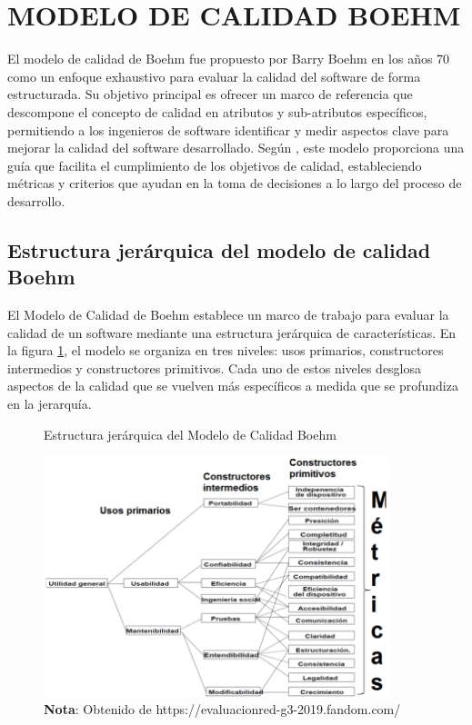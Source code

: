 	\section{MODELO DE CALIDAD BOEHM}
		El modelo de calidad de Boehm fue propuesto por Barry Boehm en los años 70 como un enfoque exhaustivo para evaluar la calidad del software de forma estructurada. Su objetivo principal es ofrecer un marco de referencia que descompone el concepto de calidad en atributos y sub-atributos específicos, permitiendo a los ingenieros de software identificar y medir aspectos clave para mejorar la calidad del software desarrollado. Según \textcite{pressman2010ingenieria}, este modelo proporciona una guía que facilita el cumplimiento de los objetivos de calidad, estableciendo métricas y criterios que ayudan en la toma de decisiones a lo largo del proceso de desarrollo.
	\subsection{Estructura jerárquica del modelo de calidad Boehm}
		El Modelo de Calidad de Boehm establece un marco de trabajo para evaluar la calidad de un software mediante una estructura jerárquica de características. En la figura \ref{fig:figura_est_boehm}, el modelo se organiza en tres niveles: usos primarios, constructores intermedios y constructores primitivos. Cada uno de estos niveles desglosa aspectos de la calidad que se vuelven más específicos a medida que se profundiza en la jerarquía.
				
		\begin{figure}[h] %
			\caption[Estructura jerárquica del Modelo de Calidad Boehm]
			{\newline Estructura jerárquica del Modelo de Calidad Boehm} %
			\vspace{0.3cm}
			\centering
			\includegraphics[width=0.9\textwidth]{imagenes/est_boehm.png} %
			\vspace{0.3cm}
			\caption*{\textup{\textbf{Nota}: Obtenido de https://evaluacionred-g3-2019.fandom.com/}}
			\vspace{-0.8cm}
			\label{fig:figura_est_boehm} %
		\end{figure}
		
